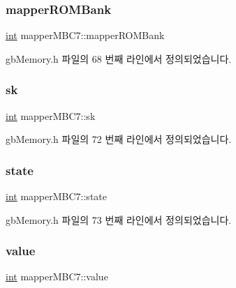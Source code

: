 \subsubsection{\texorpdfstring{mapper\+R\+O\+M\+Bank}{mapperROMBank}}
{\footnotesize\ttfamily \mbox{\hyperlink{_util_8cpp_a0ef32aa8672df19503a49fab2d0c8071}{int}} mapper\+M\+B\+C7\+::mapper\+R\+O\+M\+Bank}



gb\+Memory.\+h 파일의 68 번째 라인에서 정의되었습니다.

\mbox{\label{structmapper_m_b_c7_a088e6d513db11995a4c0be5471e6eb1e}} 
\subsubsection{\texorpdfstring{sk}{sk}}
{\footnotesize\ttfamily \mbox{\hyperlink{_util_8cpp_a0ef32aa8672df19503a49fab2d0c8071}{int}} mapper\+M\+B\+C7\+::sk}



gb\+Memory.\+h 파일의 72 번째 라인에서 정의되었습니다.

\mbox{\label{structmapper_m_b_c7_a10cd38456a7b38fd215213deca812b43}} 
\subsubsection{\texorpdfstring{state}{state}}
{\footnotesize\ttfamily \mbox{\hyperlink{_util_8cpp_a0ef32aa8672df19503a49fab2d0c8071}{int}} mapper\+M\+B\+C7\+::state}



gb\+Memory.\+h 파일의 73 번째 라인에서 정의되었습니다.

\mbox{\label{structmapper_m_b_c7_a2f07066b9e31c4e36abca0844e53e3dc}} 
\subsubsection{\texorpdfstring{value}{value}}
{\footnotesize\ttfamily \mbox{\hyperlink{_util_8cpp_a0ef32aa8672df19503a49fab2d0c8071}{int}} mapper\+M\+B\+C7\+::value}



